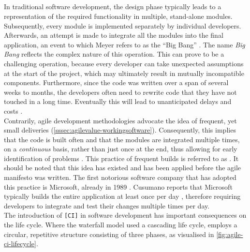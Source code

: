 
\subsection{\CI}
In traditional software development, the design phase typically leads to a representation of the required functionality in multiple, stand-alone modules. Subsequently, every module is implemented separately by individual developers. Afterwards, an attempt is made to integrate all the modules into the final application, an event to which Meyer refers to as the ``Big Bang'' \cite[~p.103]{Meyer2014}. The name \emph{Big Bang} reflects the complex nature of this operation. This can prove to be a challenging operation, because every developer can take unexpected assumptions at the start of the project, which may ultimately result in mutually incompatible components. Furthermore, since the code was written over a span of several weeks to months, the developers often need to rewrite code that they have not touched in a long time. Eventually this will lead to unanticipated delays and costs \cite{SmartJenkinsDefinitive}.\\ 

\noindent Contrarily, agile development methodologies advocate the idea of frequent, yet small deliveries (\autoref{sssec:agilevalue-workingsoftware}). Consequently, this implies that the code is built often and that the modules are integrated multiple times, on a \emph{continuous} basis, rather than just once at the end, thus allowing for early identification of problems \cite{gitlabci}. This practice of frequent builds is referred to as \emph{\CI{}} \cite{martin2014,Meyer2014}. It should be noted that this idea has existed and has been applied before the agile manifesto was written. The first notorious software company that has adopted this practice is Microsoft, already in 1989 \cite[~p.11]{cusumanomicrosoft}. Cusumano reports that Microsoft typically builds the entire application at least once per day \cite[~p.12]{cusumanomicrosoft}, therefore requiring developers to integrate and test their changes multiple times per day.\\

\noindent The introduction of \CI{} \texttt{[CI]} in software development has important consequences on the life cycle. Where the waterfall model used a cascading life cycle, \CI{} employs a circular, repetitive structure consisting of three phases, as visualised in \autoref{fig:agile-ci-lifecycle}.

